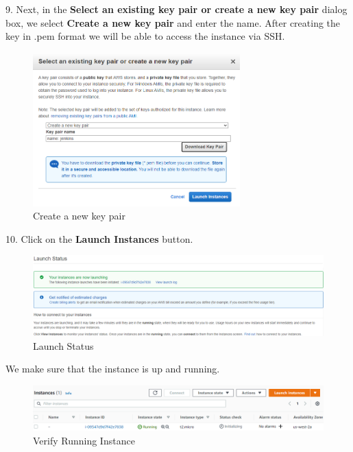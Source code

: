 \documentclass[12pt,a4paper,twoside]{article}
\begin{document}
9. Next, in the \textbf{Select an existing key pair or create a new key pair} dialog box, we select \textbf{Create a new key pair} and enter the name. After creating the key in .pem format we will be able to access the instance via SSH.


\begin{figure}[H]
    \centering
        \includegraphics[width=8cm]{images-aws/10-key-pair.png}
        \caption{Create a new key pair}
\end{figure}


10. Click on the \textbf{Launch Instances} button.


\begin{figure}[H]
    \centering
        \includegraphics[width=15cm]{images-aws/11-launch-status.png}
        \caption{Launch Status}
\end{figure}


We make sure that the instance is up and running.


\begin{figure}[H]
    \centering
        \includegraphics[width=15cm]{images-aws/13-running-instance.png}
        \caption{Verify Running Instance}
\end{figure}



~\newpage
\end{document}
